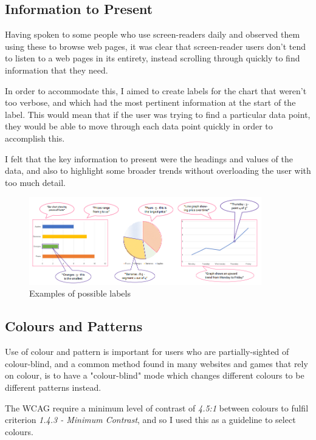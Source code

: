 \documentclass[ %
                    author={Aleena Baig},
                supervisor={Dr Simon Lock},
                    degree={BSc},
                     title={On Making Web Accessible Graphs},
                  subtitle={},
                      year={2019} ]{dissertation}
\begin{document}
\subsection{Information to Present}

Having spoken to some people who use screen-readers daily and observed them using these to browse web pages, it was clear that screen-reader users don't tend to listen to a web pages in its entirety, instead scrolling through quickly to find information that they need.

In order to accommodate this, I aimed to create labels for the chart that weren't too verbose, and which had the most pertinent information at the start of the label. This would mean that if the user was trying to find a particular data point, they would be able to move through each data point quickly in order to accomplish this.

I felt that the key information to present were the headings and values of the data, and also to highlight some broader trends without overloading the user with too much detail.

\begin{figure}[h]
\caption{Examples of possible labels}
\centering
\includegraphics[width=0.9\textwidth]{images/GraphDesignWithReadouts.PNG}
\end{figure}

\subsection{Colours and Patterns}

Use of colour and pattern is important for users who are partially-sighted of colour-blind, and a common method found in many websites and games that rely on colour, is to have a "colour-blind" mode which changes different colours to be different patterns instead.

The WCAG require a minimum level of contrast of \textit{4.5:1} between colours to fulfil criterion \textit{1.4.3 - Minimum Contrast}, and so I used this as a guideline to select colours.
\end{document}
